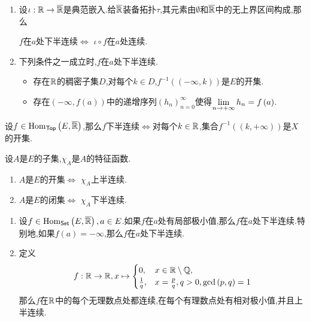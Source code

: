 \begin{remark}{}{}
	\begin{enumerate}
		\item 设$\iota:\mathbb{R}\to\overline{\mathbb{R}}$是典范嵌入.给$\overline{\mathbb{R}}$装备拓扑$\tau$,其元素由$\emptyset$和$\overline{\mathbb{R}}$中的无上界区间构成,那么
		\begin{center}
			$f$在$a$处下半连续$\iff$ $\iota\circ f$在$a$处连续.
		\end{center}
		\item 下列条件之一成立时,$f$在$a$处下半连续.
		\begin{itemize}
			\item 存在$\mathbb{R}$的稠密子集$D$,对每个$k\in D$,$f^{-1}\left(\left(-\infty,k\right)\right)$是$E$的开集.
			\item 存在$\left(-\infty,f\left(a\right)\right)$中的递增序列$\left(h_{n}\right)_{n=0}^{\infty}$使得$\displaystyle\lim_{n\to +\infty}h_{n}=f\left(a\right)$.
		\end{itemize}
	\end{enumerate}
\end{remark}

\begin{proposition}{}{}
	设$f\in\operatorname{Hom}_{\mathsf{Top}}\left(E,\overline{\mathbb{R}}\right)$,那么$f$下半连续$\iff$对每个$k\in\mathbb{R}$,集合$f^{-1}\left(\left(k,+\infty\right)\right)$是$X$的开集.
\end{proposition}

\begin{corollary}{}{}
	设$A$是$E$的子集,$\chi_{A}$是$A$的特征函数.
	\begin{enumerate}
		\item $A$是$E$的开集$\iff$ $\chi_{A}$上半连续.
		\item $A$是$E$的闭集$\iff$ $\chi_{A}$下半连续.
	\end{enumerate}
\end{corollary}

\begin{example}{}{}
	\begin{enumerate}
		\item 设$f\in\operatorname{Hom}_{\mathsf{Set}}\left(E,\overline{\mathbb{R}}\right),a\in E$.如果$f$在$a$处有局部极小值,那么$f$在$a$处下半连续.特别地,如果$f\left(a\right)=-\infty$,那么$f$在$a$处下半连续.
		\item 定义
		\begin{align*}
			f:\mathbb{R}\to\mathbb{R},x\mapsto
			\begin{cases}
				0,&x\in\mathbb{R}\setminus\mathbb{Q},\\
				\frac{1}{q},&x=\frac{p}{q},q>0,\gcd\left(p,q\right)=1
			\end{cases}
		\end{align*}
		那么$f$在$\mathbb{R}$中的每个无理数点处都连续,在每个有理数点处有相对极小值,并且上半连续.
	\end{enumerate}
\end{example}

